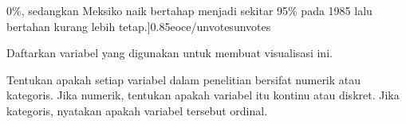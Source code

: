 {{0\%, sedangkan Meksiko naik bertahap menjadi sekitar 95\% pada 1985 lalu bertahan kurang lebih tetap.]{0.85}{eoce/unvotes}{unvotes}
}\par
\begin{parts}
\item Daftarkan variabel yang digunakan untuk membuat visualisasi ini.
\item Tentukan apakah setiap variabel dalam penelitian bersifat numerik atau
kategoris. Jika numerik, tentukan apakah variabel itu kontinu atau diskret.
Jika kategoris, nyatakan apakah variabel tersebut ordinal.
\end{parts}
}{}
